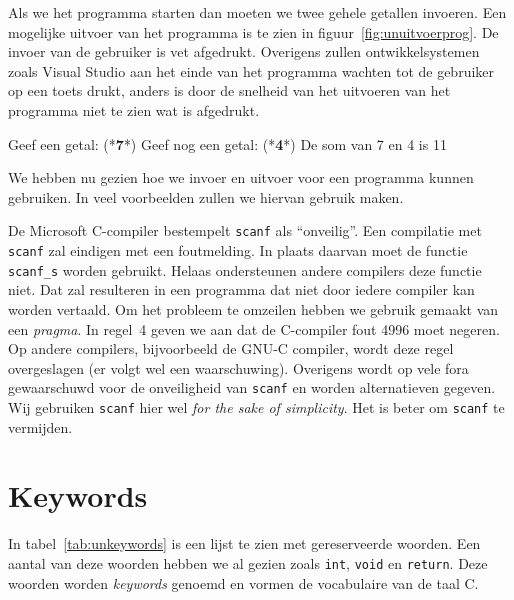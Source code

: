 Als we het programma starten dan moeten we twee gehele getallen invoeren. Een mogelijke uitvoer van het programma is te zien in figuur~\ref{fig:unuitvoerprog}. De invoer van de gebruiker is vet afgedrukt.
Overigens zullen ontwikkelsystemen zoals Visual Studio aan het einde van het programma wachten tot de gebruiker op een toets drukt, anders is door de snelheid van het uitvoeren van het programma niet te zien wat is afgedrukt.

\begin{dosbox}[title=Uitvoer van het programma in listing~\ref{cod:unscanfprogramma}.,label=fig:unuitvoerprog]
Geef een getal: (*\textbf{7}*)
Geef nog een getal: (*\textbf{4}*)
De som van 7 en 4 is 11
\end{dosbox}

We hebben nu gezien hoe we invoer en uitvoer voor een programma kunnen gebruiken. In veel voorbeelden zullen we hiervan gebruik maken.

\begin{infobox}
\label{fig:unopmerkingscanf}%
De Microsoft C-compiler bestempelt \texttt{scanf} als ``onveilig''. Een compilatie met \texttt{scanf} zal eindigen met een foutmelding. In plaats daarvan moet de functie \texttt{scanf\_s} worden gebruikt. Helaas ondersteunen andere compilers deze functie niet. Dat zal resulteren in een programma dat niet door iedere compiler kan worden vertaald. Om het probleem te omzeilen hebben we gebruik gemaakt van een \textsl{pragma}. In regel~4 geven we aan dat de C-compiler fout 4996 moet negeren. Op andere compilers, bijvoorbeeld de GNU-C compiler, wordt deze regel overgeslagen (er volgt wel een waarschuwing). Overigens wordt op vele fora gewaarschuwd voor de onveiligheid van \texttt{scanf} en worden alternatieven gegeven. Wij gebruiken \texttt{scanf} hier wel \textsl{for the sake of simplicity}. Het is beter om \texttt{scanf} te vermijden.
\end{infobox}

\section{Keywords}

In tabel~\ref{tab:unkeywords} is een lijst te zien met gereserveerde woorden. Een aantal van deze woorden hebben we al gezien zoals \texttt{int}, \texttt{void} en \texttt{return}. Deze woorden worden \textsl{keywords} genoemd en vormen de vocabulaire van de taal C.

